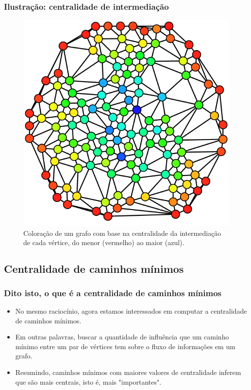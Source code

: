 \documentclass{beamer}
\begin{document}
        \begin{frame}
            \frametitle{Ilustração: centralidade de intermediação}
            \begin{figure}
                \centering
                \includegraphics[scale=0.2]{graph-betweenness.png}
                \caption{Coloração de um grafo com base na centralidade da intermediação de cada vértice, do menor (vermelho) ao maior (azul).}
            \end{figure}
        \end{frame}

    \subsection{Centralidade de caminhos mínimos}
        \begin{frame}
            \frametitle{Dito isto, o que é a centralidade de caminhos mínimos}
            \begin{itemize}
                \item No mesmo raciocínio, agora estamos interessados em computar a centralidade de caminhos mínimos.
                \item Em outras palavras, buscar a quantidade de influência que um caminho mínimo entre um par de vértices tem sobre o fluxo de informações em um grafo.
                \item Resumindo, caminhos mínimos com maiores valores de centralidade inferem que são mais centrais, isto é, mais "importantes".
            \end{itemize}
        \end{frame}
\end{document}

